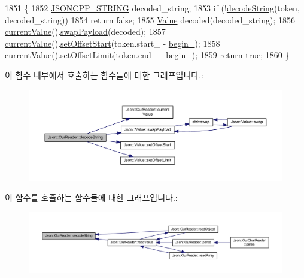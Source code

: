 \begin{DoxyCode}
1851                                          \{
1852   \hyperlink{json-forwards_8h_a1e723f95759de062585bc4a8fd3fa4be}{JSONCPP\_STRING} decoded\_string;
1853   \textcolor{keywordflow}{if} (!\hyperlink{class_json_1_1_our_reader_a34e31d8b8399b7ad493359702b6de6c9}{decodeString}(token, decoded\_string))
1854     \textcolor{keywordflow}{return} \textcolor{keyword}{false};
1855   \hyperlink{class_json_1_1_value}{Value} decoded(decoded\_string);
1856   \hyperlink{class_json_1_1_our_reader_a2acd5b1d53e7d7e17c21ff8e96edc09d}{currentValue}().\hyperlink{class_json_1_1_value_a5263476047f20e2fc6de470e4de34fe5}{swapPayload}(decoded);
1857   \hyperlink{class_json_1_1_our_reader_a2acd5b1d53e7d7e17c21ff8e96edc09d}{currentValue}().\hyperlink{class_json_1_1_value_a92e32ea0f4f8a15853a3cf0beac9feb9}{setOffsetStart}(token.start\_ - \hyperlink{class_json_1_1_our_reader_a9bda9d72335d52cd06e65f9eca3f70f5}{begin\_});
1858   \hyperlink{class_json_1_1_our_reader_a2acd5b1d53e7d7e17c21ff8e96edc09d}{currentValue}().\hyperlink{class_json_1_1_value_a5e4f5853fec138150c5df6004a8c2bcf}{setOffsetLimit}(token.end\_ - \hyperlink{class_json_1_1_our_reader_a9bda9d72335d52cd06e65f9eca3f70f5}{begin\_});
1859   \textcolor{keywordflow}{return} \textcolor{keyword}{true};
1860 \}
\end{DoxyCode}
이 함수 내부에서 호출하는 함수들에 대한 그래프입니다.\+:\nopagebreak
\begin{figure}[H]
\begin{center}
\leavevmode
\includegraphics[width=350pt]{class_json_1_1_our_reader_a34e31d8b8399b7ad493359702b6de6c9_cgraph}
\end{center}
\end{figure}
이 함수를 호출하는 함수들에 대한 그래프입니다.\+:\nopagebreak
\begin{figure}[H]
\begin{center}
\leavevmode
\includegraphics[width=350pt]{class_json_1_1_our_reader_a34e31d8b8399b7ad493359702b6de6c9_icgraph}
\end{center}
\end{figure}
\mbox{\label{class_json_1_1_our_reader_a5046dfa5d43b1770a091aac0a63a9f4b}} 
